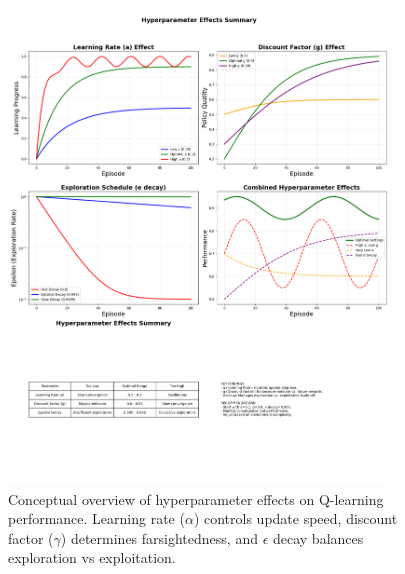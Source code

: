 \documentclass[11pt, a4paper]{article}
\begin{document}
\begin{figure}[H]
    \centering
    \includegraphics[width=0.9\textwidth]{images/hyperparameter_effects_summary.png}
    \caption{Conceptual overview of hyperparameter effects on Q-learning performance. Learning rate ($\alpha$) controls update speed, discount factor ($\gamma$) determines farsightedness, and $\epsilon$ decay balances exploration vs exploitation.}\label{fig:hyperparameter_summary}
\end{figure}
\end{document}
